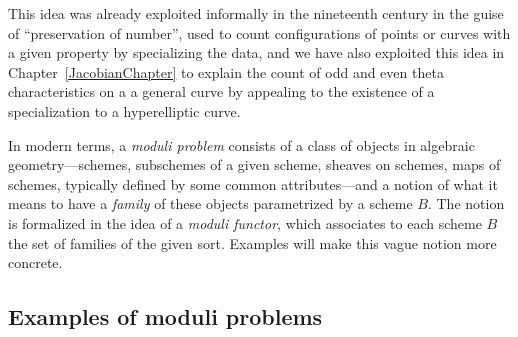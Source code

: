 This idea was already exploited informally in the nineteenth century in the guise of ``preservation of number'', used to count configurations of points or curves with a given property by specializing the 
data, and we have also exploited this idea in
Chapter~\ref{JacobianChapter} to explain the count of odd and even theta characteristics on a a general curve by appealing to the existence of a specialization to a hyperelliptic curve.

In modern terms, a \emph{moduli problem} consists of a class of objects in algebraic geometry---schemes, subschemes of a given scheme, sheaves on schemes, maps of schemes, typically defined by some common attributes---and a notion of what it means to have a \emph{family} of these objects parametrized by a scheme $B$. The notion is formalized in the idea of a \emph{moduli functor}, 
which associates to each scheme $B$ the set of families of the given sort. Examples will make this vague notion more concrete.

\subsection{Examples of moduli problems}

